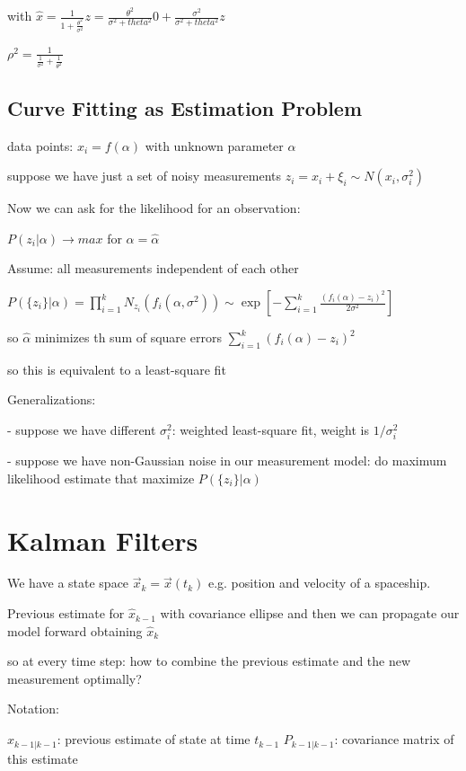 \documentclass{notebook}
\begin{document}
with $\hat{x} = \frac{1}{1+\frac{\theta^2}{\sigma^2}} z = \frac{\theta^2}{\sigma^2 + theta^2} 0 + \frac{\sigma^2}{\sigma^2 + theta^2} z$

$\rho^2 = \frac{1}{\frac{1}{\sigma^2} + \frac{1}{\theta^2}}$

\subsection*{Curve Fitting as Estimation Problem}

data points: $x_i = f(\alpha)$ with unknown parameter $\alpha$

suppose we have just a set of noisy measurements $z_i = x_i + \xi_i \sim N(x_i,\sigma_i^2)$

Now we can ask for the likelihood for an observation: 

$P({z_i}|\alpha) \to max$ for $\alpha = \hat{\alpha}$

Assume: all measurements independent of each other

$P(\{z_i\}|\alpha) = \prod_{i=1}^k N_{z_i}(f_i(\alpha, \sigma^2)) \sim \exp[-\sum_{i=1}^k \frac{(f_i(\alpha) - z_i)^2}{2 \sigma^2}]$

so $\hat{\alpha}$ minimizes th sum of square errors $\sum_{i=1}^k (f_i(\alpha) - z_i)^2$

so this is equivalent to a least-square fit

Generalizations:

 - suppose we have different $\sigma_i^2$: weighted least-square fit, weight is $1/\sigma_i^2$
 
 - suppose we have non-Gaussian noise in our measurement model: do maximum likelihood estimate that maximize $P(\{z_i\}|\alpha)$
 
\section{Kalman Filters}

We have a state space $\vec{x}_k = \vec{x}(t_k)$ e.g. position and velocity of a spaceship. 

Previous estimate for $\hat{x}_{k-1}$ with covariance ellipse and then we can propagate our model forward obtaining $\hat{x}_k$

so at  every time step: how to combine the previous estimate and the new measurement optimally?

Notation:

$\hat{x}_{k-1|k-1}$: previous estimate of state at time $t_{k-1}$
$P_{k-1|k-1}$: covariance matrix of this estimate
\end{document}
